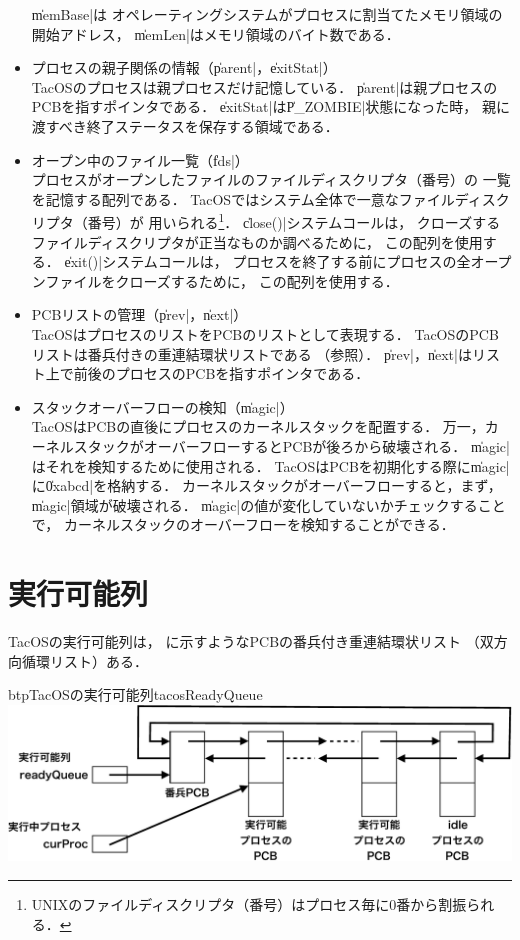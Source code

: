\begin{itemize}
  \|memBase|は
  オペレーティングシステムがプロセスに割当てたメモリ領域の開始アドレス，
  \|memLen|はメモリ領域のバイト数である．
\item プロセスの親子関係の情報（\|parent|，\|exitStat|） \\
  TacOSのプロセスは親プロセスだけ記憶している．
  \|parent|は親プロセスのPCBを指すポインタである．
  \|exitStat|は\|P_ZOMBIE|状態になった時，
  親に渡すべき終了ステータスを保存する領域である．
\item オープン中のファイル一覧（\|fds|） \\
  プロセスがオープンしたファイルのファイルディスクリプタ（番号）の
  一覧を記憶する配列である．
  TacOSではシステム全体で一意なファイルディスクリプタ（番号）が
  用いられる\footnote{
    UNIXのファイルディスクリプタ（番号）はプロセス毎に0番から割振られる．}．
  \|close()|システムコールは，
  クローズするファイルディスクリプタが正当なものか調べるために，
  この配列を使用する．
  \|exit()|システムコールは，
  プロセスを終了する前にプロセスの全オープンファイルをクローズするために，
  この配列を使用する．
\item PCBリストの管理（\|prev|，\|next|） \\
  TacOSはプロセスのリストをPCBのリストとして表現する．
  TacOSのPCBリストは番兵付きの重連結環状リストである
  （参照）．
  \|prev|，\|next|はリスト上で前後のプロセスのPCBを指すポインタである．
\item スタックオーバーフローの検知（\|magic|） \\
  TacOSはPCBの直後にプロセスのカーネルスタックを配置する．
  万一，カーネルスタックがオーバーフローするとPCBが後ろから破壊される．
  \|magic|はそれを検知するために使用される．
  TacOSはPCBを初期化する際に\|magic|に\|0xabcd|を格納する．
  カーネルスタックがオーバーフローすると，まず，\|magic|領域が破壊される．
  \|magic|の値が変化していないかチェックすることで，
  カーネルスタックのオーバーフローを検知することができる．
\end{itemize}

\section{実行可能列}
TacOSの実行可能列は，
に示すようなPCBの番兵付き重連結環状リスト
（双方向循環リスト）ある．

\begin{myfig}{btp}{TacOSの実行可能列}{tacosReadyQueue}
  \includegraphics[scale=0.6]{Fig/tacosReadyQueue-crop.pdf}
\end{myfig}

